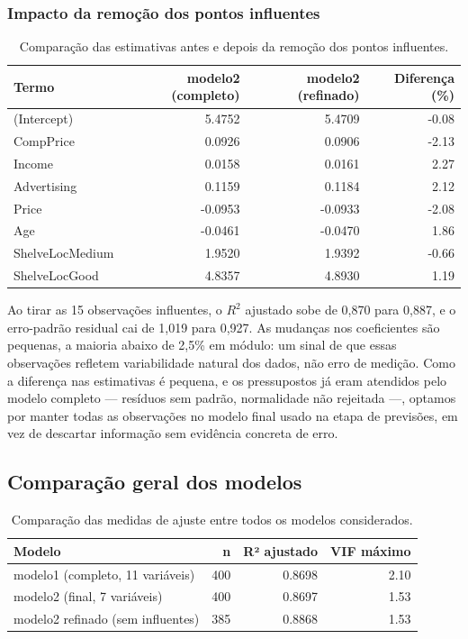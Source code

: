 \documentclass[a4paper]{modeloUFCG} %
\begin{document}
\subsubsection{Impacto da remoção dos pontos influentes}\label{impacto-da-remouxe7uxe3o-dos-pontos-influentes}

\begin{table}

\caption{\label{tab:refinado}Comparação das estimativas antes e depois da remoção dos pontos influentes.}
\centering
\begin{tabular}[t]{l|r|r|r}
\hline
Termo & modelo2 (completo) & modelo2 (refinado) & Diferença (\%)\\
\hline
(Intercept) & 5.4752 & 5.4709 & -0.08\\
\hline
CompPrice & 0.0926 & 0.0906 & -2.13\\
\hline
Income & 0.0158 & 0.0161 & 2.27\\
\hline
Advertising & 0.1159 & 0.1184 & 2.12\\
\hline
Price & -0.0953 & -0.0933 & -2.08\\
\hline
Age & -0.0461 & -0.0470 & 1.86\\
\hline
ShelveLocMedium & 1.9520 & 1.9392 & -0.66\\
\hline
ShelveLocGood & 4.8357 & 4.8930 & 1.19\\
\hline
\end{tabular}
\end{table}

Ao tirar as 15 observações influentes, o \(R^2\) ajustado sobe de 0,870 para 0,887, e o erro-padrão residual cai de 1,019 para 0,927. As mudanças nos coeficientes são pequenas, a maioria abaixo de 2,5\% em módulo: um sinal de que essas observações refletem variabilidade natural dos dados, não erro de medição. Como a diferença nas estimativas é pequena, e os pressupostos já eram atendidos pelo modelo completo --- resíduos sem padrão, normalidade não rejeitada ---, optamos por manter todas as observações no modelo final usado na etapa de previsões, em vez de descartar informação sem evidência concreta de erro.

\subsection{Comparação geral dos modelos}\label{comparauxe7uxe3o-geral-dos-modelos}

\begin{table}

\caption{\label{tab:comparaGeral}Comparação das medidas de ajuste entre todos os modelos considerados.}
\centering
\begin{tabular}[t]{l|r|r|r}
\hline
Modelo & n & R² ajustado & VIF máximo\\
\hline
modelo1 (completo, 11 variáveis) & 400 & 0.8698 & 2.10\\
\hline
modelo2 (final, 7 variáveis) & 400 & 0.8697 & 1.53\\
\hline
modelo2 refinado (sem influentes) & 385 & 0.8868 & 1.53\\
\hline
\end{tabular}
\end{table}
\end{document}
